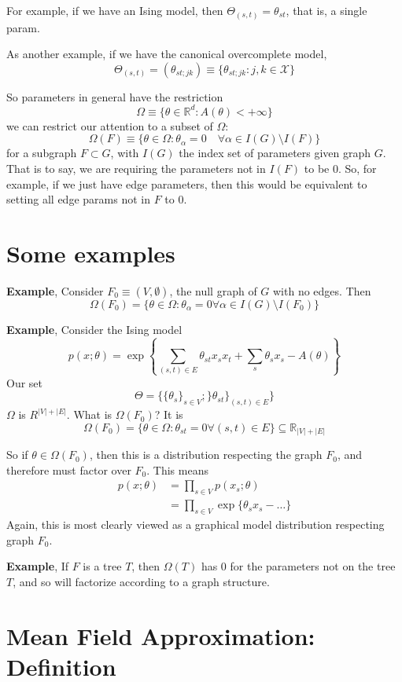 \documentclass{article}
\newcommand{\R}{\mathbb{R}}
\begin{document}
For example, if we have an Ising model, then $\Theta_{(s,t)} = \theta_{st}$, that is, a single param.

As another example, if we have the canonical overcomplete model, 
$$
\Theta_{(s,t)} = (\theta_{st;jk}) \equiv \{\theta_{st;jk} : j,k \in \mathcal X\}
$$

So parameters in general have the restriction
$$
\Omega \equiv
\{
\theta\in \R^d : A(\theta) < +\infty
\}
$$
we can restrict our attention to a subset of $\Omega$:
$$
\Omega(F)
\equiv
\{
\theta\in \Omega
:
\theta_{\alpha} = 0
\quad
\forall \alpha \in I(G) \setminus I(F)
\}
$$
for a subgraph $F\subset G$, with $I(G)$ the index set of parameters given graph $G$.
That is to say, we are requiring the parameters not in $I(F)$ to be 0.
So, for example, if we just have edge parameters, then this would be equivalent to setting all edge params not in $F$ to 0.

\section{Some examples}

\textbf{Example},
Consider $F_{0} \equiv (V,\emptyset)$, the null graph of $G$ with no edges.
Then
$$
\Omega(F_0) = 
\{
\theta\in\Omega:
\theta_\alpha = 0
\forall \alpha \in 
I(G) \setminus I(F_0)
\}
$$

\textbf{Example},
Consider the Ising model
$$
p(x;\theta)
=
\exp
\left\{
\sum_{(s,t)\in E}
\theta_{st} x_s x_t
+ \sum_{s}
\theta_s x_s
-
A(\theta)
\right\}
$$
Our set 
$$
\Theta = 
\{
\{\theta_s\}_{s\in V};
\}\theta_{st}\}_{(s,t)\in E}
\}
$$
$\Omega$ is $R^{|V| + |E|}$.
What is $\Omega(F_0)$?
It is
$$
\Omega(F_0) = 
\{
\theta\in\Omega :
\theta_{st} = 0
\forall (s,t)\in E
\}
\subseteq \R_{|V| + |E|}
$$

So if $\theta\in\Omega(F_0)$, then this is a distribution respecting the graph $F_0$, and therefore must factor over $F_0$.
This means
\begin{align}
p(x;\theta)
&=
\prod_{s\in V}
p(x_s ; \theta)
\\
&=
\prod_{s\in V} \exp\{\theta_sx_s - \dots\}
\end{align}
Again, this is most clearly viewed as a graphical model distribution respecting graph $F_0$.


\textbf{Example},
If $F$ is a tree $T$, then $\Omega(T)$ has 0 for the parameters not on the tree $T$, and so will factorize according to a graph structure.

\section{Mean Field Approximation: Definition}
\end{document}
